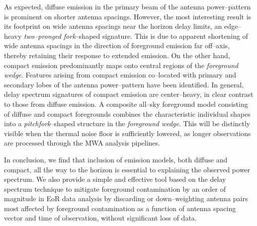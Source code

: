 \documentclass[preprint2,iop,numberedappendix]{emulateapj}
\begin{document}
As expected, diffuse emission in the primary beam of the antenna power--pattern is prominent on shorter antenna spacings. However, the most interesting result is its footprint on wide antenna spacings near the horizon delay limits, an edge--heavy {\it two--pronged fork}--shaped signature. This is due to apparent shortening of wide antenna spacings in the direction of foreground emission far off--axis, thereby retaining their response to extended emission. On the other hand, compact emission predominantly maps onto central regions of the {\it foreground wedge}. Features arising from compact emission co--located with primary and secondary lobes of the antenna power--pattern have been identified. In general, delay spectrum signatures of compact emission are center--heavy, in clear contrast to those from diffuse emission. A composite all--sky foreground model consisting of diffuse and compact foregrounds combines the characteristic individual shapes into a {\it pitchfork}--shaped structure in the {\it foreground wedge}. This will be distinctly visible when the thermal noise floor is sufficiently lowered, as longer observations are processed through the MWA analysis pipelines.

In conclusion, we find that inclusion of emission models, both diffuse and compact, all the way to the horizon is essential to explaining the observed power spectrum. We also provide a simple and effective tool based on the delay spectrum technique to mitigate foreground contamination by an order of magnitude in EoR data analysis by discarding or down--weighting antenna pairs most affected by foreground contamination as a function of antenna spacing vector and time of observation, without significant loss of data.

\acknowledgments
\end{document}
